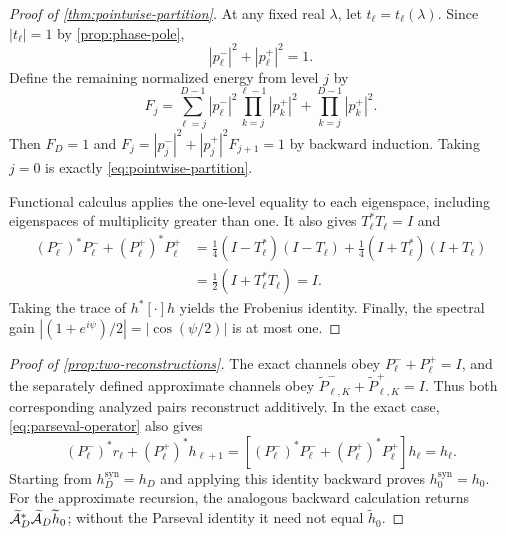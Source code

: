 \begin{proof}[Proof of \cref{thm:pointwise-partition}]
At any fixed real $\lambda$, let $t_\ell=t_\ell(\lambda)$.  Since
$|t_\ell|=1$ by \cref{prop:phase-pole},
\begin{equation}
 |p_\ell^-|^2+|p_\ell^+|^2=1.
\end{equation}
Define the remaining normalized energy from level $j$ by
\begin{equation}
 F_j=\sum_{\ell=j}^{D-1}|p_\ell^-|^2
             \prod_{k=j}^{\ell-1}|p_k^+|^2
     +\prod_{k=j}^{D-1}|p_k^+|^2.
\end{equation}
Then $F_D=1$ and
$F_j=|p_j^-|^2+|p_j^+|^2F_{j+1}=1$ by backward induction.  Taking $j=0$
is exactly \cref{eq:pointwise-partition}.

Functional calculus applies the one-level equality to each eigenspace,
including eigenspaces of multiplicity greater than one.  It also gives
$T_\ell^*T_\ell=I$ and
\begin{align}
 (P_\ell^-)^*P_\ell^-+(P_\ell^+)^*P_\ell^+
 &=\tfrac14(I-T_\ell^*)(I-T_\ell)
   +\tfrac14(I+T_\ell^*)(I+T_\ell)\\
 &=\tfrac12(I+T_\ell^*T_\ell)=I.
\end{align}
Taking the trace of $h^*[\cdot]h$ yields the Frobenius identity.  Finally,
the spectral gain $|(1+e^{i\psi})/2|=|\cos(\psi/2)|$ is at most one.
\end{proof}

\begin{proof}[Proof of \cref{prop:two-reconstructions}]
The exact channels obey $P_\ell^-+P_\ell^+=I$, and the separately defined
approximate channels obey
$\widetilde P_{\ell,K}^-+\widetilde P_{\ell,K}^+=I$.  Thus both corresponding
analyzed pairs reconstruct additively.  In the exact case,
\cref{eq:parseval-operator} also gives
\begin{equation}
 (P_\ell^-)^*r_\ell+(P_\ell^+)^*h_{\ell+1}
 =[(P_\ell^-)^*P_\ell^-+(P_\ell^+)^*P_\ell^+]h_\ell=h_\ell.
\end{equation}
Starting from $h_D^{\mathrm{syn}}=h_D$ and applying this identity backward
proves $h_0^{\mathrm{syn}}=h_0$.  For the approximate recursion, the analogous
backward calculation returns
$\widetilde{\mathcal A}_D^*\widetilde{\mathcal A}_D\widetilde h_0$; without the Parseval
identity it need not equal $\widetilde h_0$.
\end{proof}

